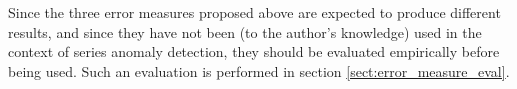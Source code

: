 Since the three error measures proposed above are expected to produce different results, and since they have not been (to the author's knowledge) used in the context of series anomaly detection, they should be evaluated empirically before being used. Such an evaluation is performed in section \ref{sect:error_measure_eval}.

